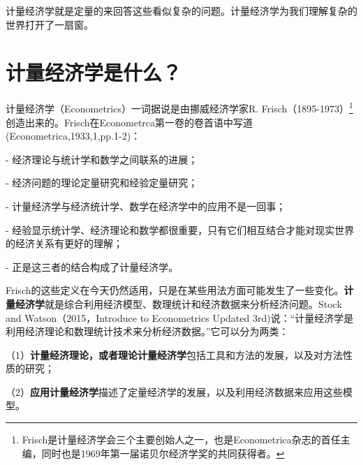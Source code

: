 \documentclass[cn,10pt,math=newtx,citestyle=gb7714-2015,bibstyle=gb7714-2015]{elegantbook}
\begin{document}
	计量经济学就是定量的来回答这些看似复杂的问题。计量经济学为我们理解复杂的世界打开了一扇窗。
	\section{计量经济学是什么？}
	\begin{flushleft}
		计量经济学（Econometrics）一词据说是由挪威经济学家R. Frisch（1895-1973）\footnote{Frisch是计量经济学会三个主要创始人之一，也是Econometrica杂志的首任主编，同时也是1969年第一届诺贝尔经济学奖的共同获得者。}创造出来的。Frisch在Econometrca第一卷的卷首语中写道(Econometrica,1933,1,pp.1-2)：
		
		\item[-] 经济理论与统计学和数学之间联系的进展；
		
		\item[-] 经济问题的理论定量研究和经验定量研究；
		
		\item[-] 计量经济学与经济统计学、数学在经济学中的应用不是一回事；
		
		\item[-] 经验显示统计学、经济理论和数学都很重要，只有它们相互结合才能对现实世界的经济关系有更好的理解；
		
		\item[-] 正是这三者的结合构成了计量经济学。
		\par Frisch的这些定义在今天仍然适用，只是在某些用法方面可能发生了一些变化。\textbf{计量经济学}就是综合利用经济模型、数理统计和经济数据来分析经济问题。Stock and Watson（2015，Introduce to Econometrics Updated 3rd)说：“计量经济学是利用经济理论和数理统计技术来分析经济数据。”它可以分为两类：
		
		（1）\textbf{计量经济理论，或者理论计量经济学}包括工具和方法的发展，以及对方法性质的研究；
		
		（2）\textbf{应用计量经济学}描述了定量经济学的发展，以及利用经济数据来应用这些模型。
	\end{flushleft}
\end{document}
